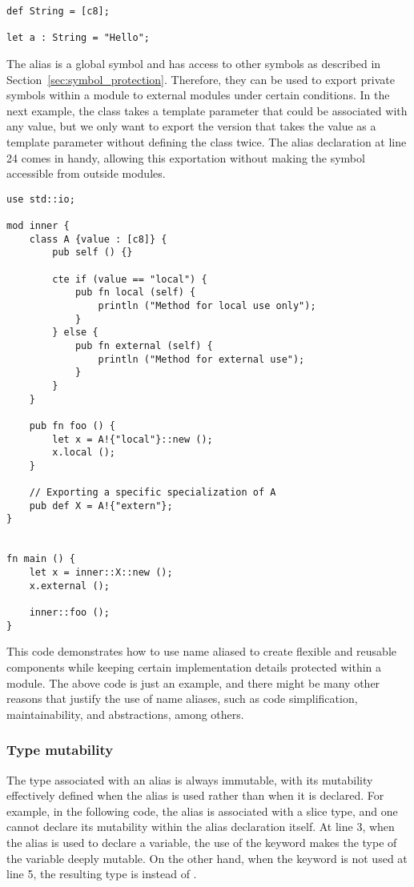 \begin{lstlisting}[style=coloredverbatim]
def String = [c8];

let a : String = "Hello";
\end{lstlisting}

The alias is a global symbol and has access to other symbols as described in
Section~\ref{sec:symbol_protection}. Therefore, they can be used to export
private symbols within a module to external modules under certain conditions. In
the next example, the class  takes a template parameter that could be
associated with any value, but we only want to export the version that takes the
value  as a template parameter without defining the class twice.
The alias declaration  at line 24 comes in handy, allowing this
exportation without making the symbol  accessible from outside modules.

\begin{lstlisting}[style=coloredverbatim]
use std::io;

mod inner {
    class A {value : [c8]} {
        pub self () {}

        cte if (value == "local") {
            pub fn local (self) {
                println ("Method for local use only");
            }
        } else {
            pub fn external (self) {
                println ("Method for external use");
            }
        }
    }

    pub fn foo () {
        let x = A!{"local"}::new ();
        x.local ();
    }

    // Exporting a specific specialization of A
    pub def X = A!{"extern"};
}


fn main () {
    let x = inner::X::new ();
    x.external ();

    inner::foo ();
}
\end{lstlisting}

This code demonstrates how to use name aliased to create flexible and reusable
components while keeping certain implementation details protected within a
module. The above code is just an example, and there might be many other reasons
that justify the use of name aliases, such as code simplification,
maintainability, and abstractions, among others.


\subsubsection{Type mutability}

The type associated with an alias is always immutable, with its mutability
effectively defined when the alias is used rather than when it is declared. For
example, in the following code, the alias  is associated with a
\token{[i32]} slice type, and one cannot declare its mutability within the alias
declaration itself. At line 3, when the alias  is used to
declare a variable, the use of the keyword  makes the type of the
variable deeply mutable. On the other hand, when the keyword  is not
used at line 5, the resulting type is  instead of .

